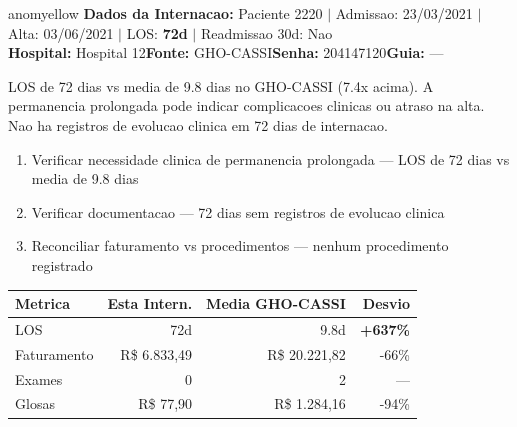 \documentclass[a4paper,10pt]{article}
\begin{document}
\newpage

\begin{anomalycard}[Internacao 1962 | GHO-CASSI | MODERADO (z=2.24)]{anomyellow}
\textbf{Dados da Internacao:} Paciente 2220 $\mid$ Admissao: 23/03/2021 $\mid$ Alta: 03/06/2021 $\mid$ LOS: \textbf{72d} $\mid$ Readmissao 30d: Nao\\
\textbf{Hospital:} Hospital 12\quad\textbf{Fonte:} GHO-CASSI\quad\textbf{Senha:} 204147120\quad\textbf{Guia:} ---\\
\vspace{2pt}\begin{tcolorbox}[colback=severityred!20,colframe=anomyellow,title={\textbf{Interpretacao de Negocio}},fonttitle=\bfseries\small,left=4pt,right=4pt,top=3pt,bottom=3pt]
{\small LOS de 72 dias vs media de 9.8 dias no GHO-CASSI (7.4x acima). A permanencia prolongada pode indicar complicacoes clinicas ou atraso na alta. Nao ha registros de evolucao clinica em 72 dias de internacao.}
\end{tcolorbox}
\begin{tcolorbox}[colback=severityyellow!30,colframe=anomorange,title={\textbf{Recomendacoes Especificas}},fonttitle=\bfseries\small,left=4pt,right=4pt,top=3pt,bottom=3pt]
\begin{enumerate}[nosep,leftmargin=16pt]
\item {\small Verificar necessidade clinica de permanencia prolongada --- LOS de 72 dias vs media de 9.8 dias}
\item {\small Verificar documentacao --- 72 dias sem registros de evolucao clinica}
\item {\small Reconciliar faturamento vs procedimentos --- nenhum procedimento registrado}
\end{enumerate}
\end{tcolorbox}
\begin{center}\begin{tabular}{l r r r}\toprule\textbf{Metrica} & \textbf{Esta Intern.} & \textbf{Media GHO-CASSI} & \textbf{Desvio} \\\midrule
LOS & 72d & 9.8d & \textcolor{anomred}{\textbf{+637\%}} \\
Faturamento & R\$ 6.833,49 & R\$ 20.221,82 & -66\% \\
Exames & 0 & 2 & --- \\
Glosas & R\$ 77,90 & R\$ 1.284,16 & -94\% \\
\bottomrule\end{tabular}\end{center}


\end{anomalycard}
\end{document}
